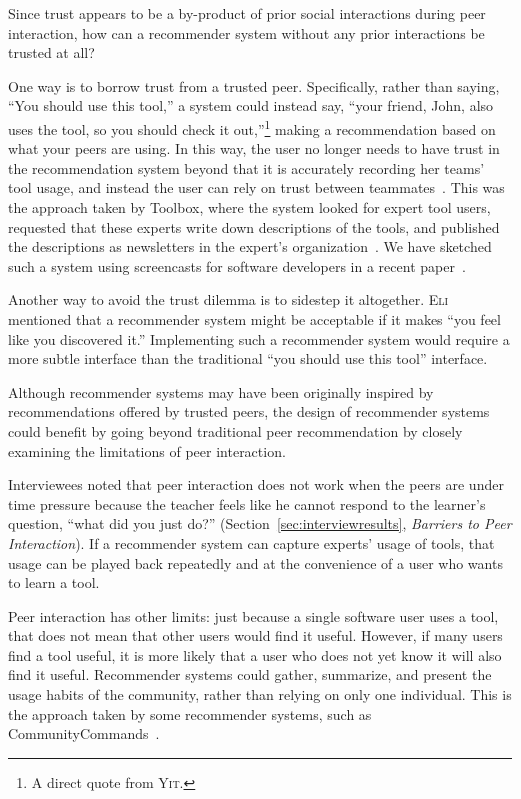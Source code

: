 \documentclass[smallextended]{svjour3}
\newcommand\discovery{peer interaction\xspace}
\newcommand\Discovery{Peer interaction\xspace}
\newcommand\DisCovery{Peer Interaction\xspace}
\newcommand\discpush{peer recommendation\xspace}
\newcommand{\subject}[1]{\textsc{#1}}
\newcommand{\csub}{{\subject{Eli}}\xspace}
\newcommand{\jsub}{{\subject{Yit}}\xspace}
\begin{document}
Since trust appears to be a by-product of prior social interactions during \discovery,
how can a recommender system without any prior interactions be trusted
at all?

One way is to borrow trust from a trusted peer. 
Specifically, rather than saying, ``You should use this tool,'' a
system could instead say, ``your friend, John, also uses the
tool, so you should check it out,''\footnote{A direct quote from \jsub.} making
a recommendation based on what your peers are using.
In this way, the user no longer needs to have trust in the recommendation
system beyond that it is accurately recording her teams' tool usage, and
instead the user can rely on trust between teammates~\citep{murphyHill12b}.
This was the approach taken by Toolbox, where the system
looked for expert tool users, requested that these experts write down
descriptions of the tools, and published the descriptions as newsletters in
the expert's organization~\citep{maltzahn}.
We have sketched such a system using screencasts 
for software developers in a recent paper~\citep{murphyHill12b}.

Another way to avoid the trust dilemma is to sidestep it altogether.
\csub mentioned that a recommender system might be acceptable if it makes ``you
feel like you discovered it.''
Implementing such a recommender system would require a more subtle interface
than the traditional ``you should use this tool'' interface.

\paraHead{Beyond \DisCovery.}
Although recommender systems may have been originally inspired by
recommendations offered by trusted peers, the design of recommender systems
could benefit by going beyond traditional \discpush by closely
examining the limitations of \discovery.

Interviewees noted that \discovery does not work when the peers are under time
pressure because the teacher feels like he cannot respond to the learner's
question, ``what did you just do?'' (Section~\ref{sec:interviewresults}, \textit{Barriers to Peer Interaction}).
If a recommender system can capture experts' usage of tools, that
usage can be played back repeatedly and at the convenience of a user who
wants to learn a tool.

\Discovery has other limits: just because a single software user uses a tool,
that does not mean that other users would find it useful.
However, if many users find a tool useful, it is more likely that a
user who does not yet know it will also find it useful.
Recommender systems could gather, summarize, and present the usage habits of
the community, rather than relying on only one individual.
This is the approach taken by some recommender systems, such as
CommunityCommands~\citep{matejka09}.
\end{document}
